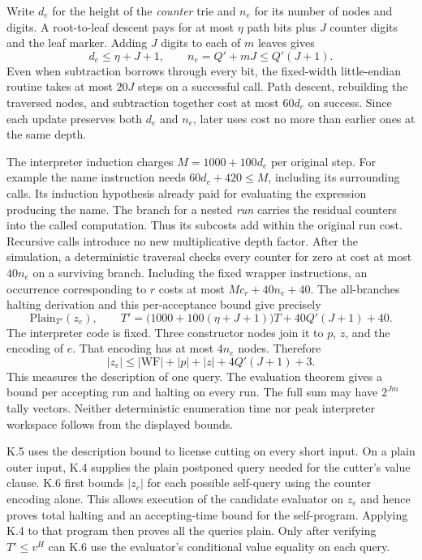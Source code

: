 \clearpage
{}

Write $d_e$ for the height of the \emph{counter} trie and $n_e$ for its
number of nodes and digits. A root-to-leaf descent pays for at most
$\eta$ path bits plus $J$ counter digits and the leaf marker. Adding $J$
digits to each of $m$ leaves gives
\[
 d_e\le\eta+J+1,\qquad n_e=Q'+mJ\le Q'(J+1).
\]
Even when subtraction borrows through every bit, the fixed-width
little-endian routine takes at most $20J$ steps on a successful call.
Path descent, rebuilding the traversed nodes, and subtraction together
cost at most $60d_e$ on success. Since each update preserves both $d_e$
and $n_e$, later uses cost no more than earlier ones at the same depth.

The interpreter induction charges
$M=1000+100d_e$ per original step. For example the name instruction
needs $60d_e+420\le M$, including its surrounding calls. Its induction
hypothesis already paid for evaluating the expression producing the name.
The branch for a nested \emph{run} carries the residual counters into
the called computation. Thus its subcosts add within the original run
cost. Recursive calls introduce no new multiplicative depth factor.
After the simulation, a deterministic traversal checks every counter for
zero at cost at most $40n_e$ on a surviving branch. Including the fixed
wrapper instructions, an occurrence corresponding to $r$ costs at most
$Mc_r+40n_e+40$. The all-branches halting derivation and this per-acceptance
bound give precisely
\[
   \mathrm{Plain}_{T'}(z_e),\qquad
   T'=\bigl(1000+100(\eta+J+1)\bigr)T+40Q'(J+1)+40.
\]
The interpreter code is fixed. Three constructor nodes join it to $p$,
$z$, and the encoding of $e$. That encoding has at most $4n_e$ nodes.
Therefore
\[
 |z_e|\le |\mathrm{WF}|+|p|+|z|+4Q'(J+1)+3.
\]
This measures the description of one query. The evaluation theorem
gives a bound per accepting run and halting on every run. The full sum
may have $2^{Jm}$ tally vectors. Neither deterministic enumeration time
nor peak interpreter workspace follows from the displayed bounds.

K.5 uses the description bound to license cutting on every short input.
On a plain outer input, K.4 supplies the plain postponed query needed for
the cutter's value clause. K.6 first bounds $|z_e|$ for each possible
self-query using the counter encoding alone. This allows execution of
the candidate evaluator on $z_e$ and hence proves total halting and an
accepting-time bound for the self-program. Applying K.4 to that program
then proves all the queries plain. Only after verifying $T'\le v^H$ can
K.6 use the evaluator's conditional value equality on each query.

